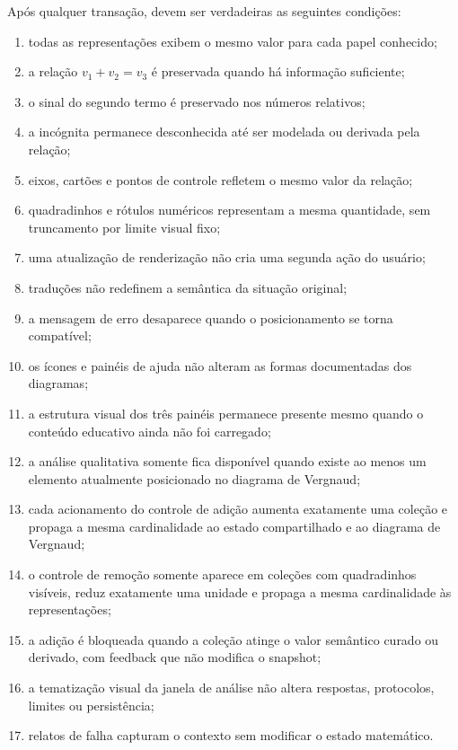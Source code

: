 \documentclass[12pt,a4paper]{article}
\begin{document}
Após qualquer transação, devem ser verdadeiras as seguintes condições:
\begin{enumerate}[noitemsep]
  \item todas as representações exibem o mesmo valor para cada papel conhecido;
  \item a relação $v_1+v_2=v_3$ é preservada quando há informação suficiente;
  \item o sinal do segundo termo é preservado nos números relativos;
  \item a incógnita permanece desconhecida até ser modelada ou derivada pela relação;
  \item eixos, cartões e pontos de controle refletem o mesmo valor da relação;
  \item quadradinhos e rótulos numéricos representam a mesma quantidade, sem truncamento por limite visual fixo;
  \item uma atualização de renderização não cria uma segunda ação do usuário;
  \item traduções não redefinem a semântica da situação original;
  \item a mensagem de erro desaparece quando o posicionamento se torna compatível;
  \item os ícones e painéis de ajuda não alteram as formas documentadas dos diagramas;
  \item a estrutura visual dos três painéis permanece presente mesmo quando o conteúdo educativo ainda não foi carregado;
  \item a análise qualitativa somente fica disponível quando existe ao menos um elemento atualmente posicionado no diagrama de Vergnaud;
  \item cada acionamento do controle de adição aumenta exatamente uma coleção e propaga a mesma cardinalidade ao estado compartilhado e ao diagrama de Vergnaud;
  \item o controle de remoção somente aparece em coleções com quadradinhos visíveis, reduz exatamente uma unidade e propaga a mesma cardinalidade às representações;
  \item a adição é bloqueada quando a coleção atinge o valor semântico curado ou derivado, com feedback que não modifica o snapshot;
  \item a tematização visual da janela de análise não altera respostas, protocolos, limites ou persistência;
  \item relatos de falha capturam o contexto sem modificar o estado matemático.
\end{enumerate}
\end{document}
